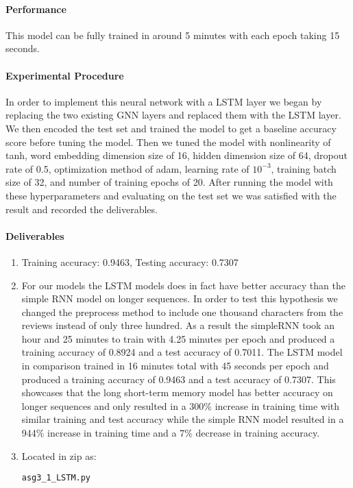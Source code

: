 \documentclass[11pt,letterpaper]{article}
\begin{document}
\paragraph{Performance} This model can be fully trained in around 5 minutes with each epoch taking 15 seconds. 

\paragraph{Experimental Procedure} In order to implement this neural network with a LSTM layer we began by replacing the two existing GNN layers and replaced them with the LSTM layer. We then encoded the test set and trained the model to get a baseline accuracy score before tuning the model. Then we tuned the model with nonlinearity of tanh, word embedding dimension size of 16, hidden dimension size of 64, dropout rate of 0.5, optimization method of adam, learning rate of $10^{-3}$, training batch size of 32, and number of training epochs of 20. After running the model with these hyperparameters and evaluating on the test set we was satisfied with the result and recorded the deliverables. 

\paragraph{Deliverables} 
\begin{enumerate}
	\item Training accuracy: 0.9463, Testing accuracy: 0.7307
	\item For our models the LSTM models does in fact have better accuracy than the simple RNN model on longer sequences. In order to test this hypothesis we changed the preprocess method to include one thousand characters from the reviews instead of only three hundred. As a result the simpleRNN took an hour and 25 minutes to train with 4.25 minutes per epoch and produced a training accuracy of 0.8924 and a test accuracy of 0.7011. The LSTM model in comparison trained in 16 minutes total with 45 seconds per epoch and produced a training accuracy of 0.9463 and a test accuracy of 0.7307. This showcases that the long short-term memory model has better accuracy on longer sequences and only resulted in a 300\% increase in training time with similar training and test accuracy while the simple RNN model resulted in a 944\% increase in training time and a 7\% decrease in training accuracy. 
	\item Located in zip as: \begin{verbatim}asg3_1_LSTM.py
	\end{verbatim}
\end{enumerate}
\end{document}
